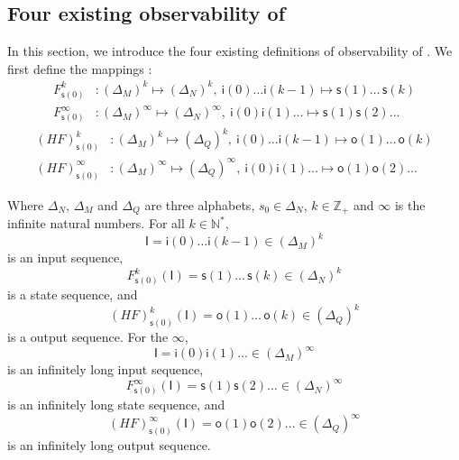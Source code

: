 \subsection{Four existing observability of \BCNs}
In this section, we introduce the four existing definitions of observability of \BCNs. %
We first define the mappings \cite{Zhang2016Observability}:
\begin{equation}
\begin{split}
F^k_{\mathsf{s}(0)} &: (\Delta_M)^k\mapsto(\Delta_N)^k,\ \mathsf{i}(0)\ldots \mathsf{i}({k-1}) \mapsto \mathsf{s}(1) \ldots\, \mathsf{s}(k)\\
F^{\infty}_{\mathsf{s}(0)} &: (\Delta_M)^{\infty}\mapsto(\Delta_N)^{\infty},\ \mathsf{i}(0) \mathsf{i}(1) \ldots  \mapsto \mathsf{s}(1) \mathsf{s}(2) \ldots
\end{split}
\label{equ:5}
\end{equation}
\begin{equation}
\begin{split}
(HF)^k_{\mathsf{s}(0)} &: (\Delta_M)^k\mapsto(\Delta_Q)^k,\ \mathsf{i}(0)\ldots \mathsf{i}(k-1) \mapsto \mathsf{o}(1)\ldots\, \mathsf{o}(k)\\
(HF)^{\infty}_{\mathsf{s}(0)} &: (\Delta_M)^{\infty}\mapsto(\Delta_Q)^{\infty},\ \mathsf{i}(0) \mathsf{i}(1) \ldots  \mapsto \mathsf{o}(1) \mathsf{o}(2)\ldots
\end{split}
\label{equ:6}
\end{equation}

Where $\Delta_N$, $\Delta_M$ and $\Delta_Q$ are three alphabets, $s_0\in \Delta_N$, $k\in \mathbb{Z}_+$ and $\infty$ is the infinite natural numbers. For all  $k\in \mathbb{N}^*$, 
\[\mathsf{I}=\mathsf{i}(0)\ldots \mathsf{i}({k-1}) \in(\Delta_M)^k\] 
is an input sequence, 
\[F^k_{\mathsf{s}(0)}(\mathsf{I})=\mathsf{s}(1) \ldots\, \mathsf{s}(k) \in(\Delta_N)^k\]
 is a state sequence, and 
 \[(HF)^k_{\mathsf{s}(0)}(\mathsf{I})=\mathsf{o}(1)\ldots\, \mathsf{o}(k) \in(\Delta_Q)^k\] 
 is a output sequence. For the $\infty$, 
 \[\mathsf{I}=\mathsf{i}(0) \mathsf{i}(1)\ldots  \in(\Delta_M)^{\infty}\] 
 is an infinitely long input sequence, 
 \[F^{\infty}_{\mathsf{s}(0)}(\mathsf{I})=\mathsf{s}(1) \mathsf{s}(2)\ldots  \in(\Delta_N)^{\infty}\] 
 is an infinitely long state sequence, and 
 \[(HF)^{\infty}_{\mathsf{s}(0)}(\mathsf{I})=\mathsf{o}(1) \mathsf{o}(2)\ldots \in(\Delta_Q)^{\infty}\]
  is an infinitely long output sequence. 
  
